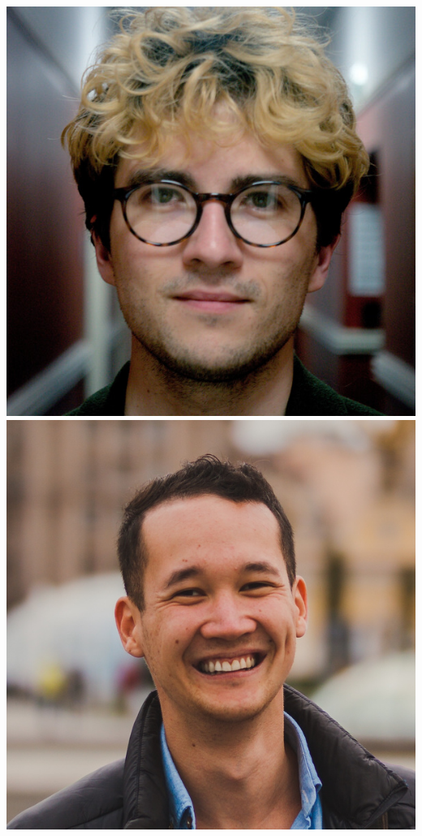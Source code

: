 \documentclass[aspectratio=169]{beamer}
\begin{document}
\begin{frame}
{        \includegraphics[width=0.08\textheight]{people/harvey_williams.jpg}%
        \includegraphics[width=0.08\textheight]{people/kilian_scheutwinkel.jpg}%
}
\end{frame}
\end{document}
